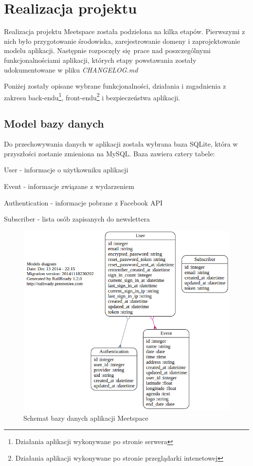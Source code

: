 \section{Realizacja projektu}
Realizacja projektu Meetspace została podzielona na kilka etapów. Pierwszymi z nich było przygotowanie środowiska, zarejestrowanie domeny i zaprojektowanie modelu aplikacji. Następnie rozpoczęły się prace nad poszczególnymi funkcjonalnościami aplikacji, których etapy powstawania zostały udokumentowane w pliku \emph{CHANGELOG.md}

Poniżej zostały opisane wybrane funkcjonalności, działania i zagadnienia z zakresu back-endu\footnote{Działania aplikacji wykonywane po stronie serwera}, front-endu\footnote{Działania aplikacji wykonywane po stronie przeglądarki intenetowej} i bezpieczeństwa aplikacji.
  \clearpage
  \subsection{Model bazy danych}
    Do przechowywania danych w aplikacji została wybrana baza SQLite, która w przyszłości zostanie zmieniona na MySQL. Baza zawiera cztery tabele:
    \begin{itemizeReduced}
      \item User - informacje o użytkowniku aplikacji
      \item Event - informacje związane z wydarzeniem
      \item Authentication - informacje pobrane z Facebook API
      \item Subscriber - lista osób zapisanych do newslettera
    \end{itemizeReduced}

    \begin{figure}[h]
      \centering
        \includegraphics[scale=0.55]{images/dbm.png}
      \caption{Schemat bazy danych aplikacji Meetspace}
    \end{figure}


